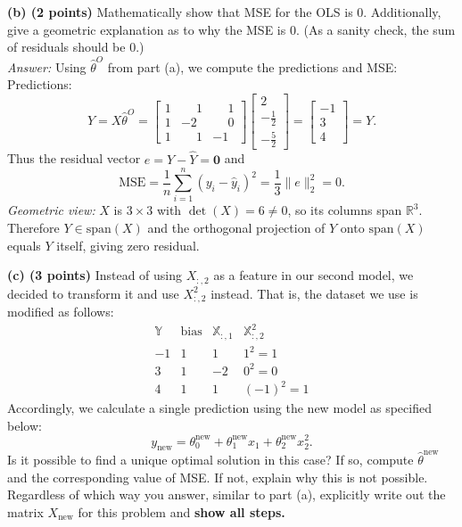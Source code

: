 \documentclass[11pt]{article}
\begin{document}
\medskip
\noindent\textbf{(b) (2 points)} Mathematically show that MSE for the OLS is 0. Additionally, give a geometric explanation as to why the MSE is 0. (As a sanity check, the sum of residuals should be 0.)
\medskip
\\\noindent\textit{Answer:}
Using $\hat\theta^{O}$ from part (a), we compute the predictions and MSE:
\smallskip
\\\noindent Predictions:
\[
\hat Y=X\hat\theta^{O}
=
\begin{bmatrix}
1 & \phantom{-}1 & \phantom{-}1\\
1 & -2 & \phantom{-}0\\
1 & \phantom{-}1 & -1
\end{bmatrix}
\begin{bmatrix}
2\\ -\tfrac12\\ -\tfrac52
\end{bmatrix}
=
\begin{bmatrix}
-1\\[2pt]3\\[2pt]4
\end{bmatrix}
=Y.
\]
Thus the residual vector $e=Y-\hat Y=\mathbf{0}$ and
\[
\text{MSE}=\frac1n\sum_{i=1}^n (y_i-\hat y_i)^2
=\frac13\|e\|_2^2
=0.
\]
\textit{Geometric view:} $X$ is $3\times3$ with $\det(X)=6\neq0$, so its columns span $\mathbb{R}^3$. Therefore $Y\in\mathrm{span}(X)$ and the orthogonal projection of $Y$ onto $\mathrm{span}(X)$ equals $Y$ itself, giving zero residual.
\medskip

\noindent\textbf{(c) (3 points)} Instead of using $X_{:,2}$ as a feature in our second model, we decided to transform it and use $X_{:,2}^2$ instead. That is, the dataset we use is modified as follows:
\[
\begin{array}{c|ccc}
\mathbb{Y}  & \text{bias} & \mathbb{X} _{:,1} & \mathbb{X} _{:,2}^2\\ \hline
-1 & 1 & 1  & 1^2=1\\
 3 & 1 & -2 & 0^2=0\\
 4 & 1 & 1  & (-1)^2=1
\end{array}
\]
Accordingly, we calculate a single prediction using the new model as specified below:
\[
y_{\text{new}}=\theta^{\text{new}}_0+\theta^{\text{new}}_1 x_1+\theta^{\text{new}}_2 x_2^2.
\]
Is it possible to find a unique optimal solution in this case? If so, compute $\hat{\theta}^{\text{new}}$ and the corresponding value of MSE. If not, explain why this is not possible. Regardless of which way you answer, similar to part (a), explicitly write out the matrix $X_{\text{new}}$ for this problem and \textbf{show all steps.}
\end{document}
